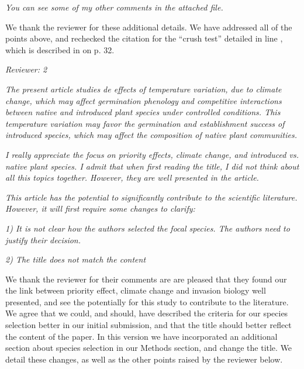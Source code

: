 \documentclass[11pt]{article}
\begin{document}



\emph{You can see some of my other comments in the attached file.}

We thank the reviewer for these additional details. We have addressed all of the points above, and rechecked the citation for the ``crush test'' detailed in line , which is described in \citet{Baskin2014} on p. 32. 

\emph{Reviewer: 2}

\emph{The present article studies de effects of temperature variation, due to climate change, which may affect germination phenology and competitive interactions between native and introduced plant species under controlled conditions. This temperature variation may favor the germination and establishment success of introduced species, which may affect the composition of native plant communities.}

\emph{I really appreciate the focus on priority effects, climate change, and introduced vs. native plant species. I admit that when first reading the title, I did not think about all this topics together. However, they are well presented in the article.}

\emph{This article has the potential to significantly contribute to the scientific literature. However, it will first require some changes to clarify:}

\emph{1) It is not clear how the authors selected the focal species. The authors need to justify their decision.}

\emph{2) The title does not match the content}

We thank the reviewer for their comments are are pleased that they found our the link between priority effect, climate change and invasion biology well presented, and see the potentially for this study to contribute to the literature. We agree that we could, and should, have described the criteria for our species selection better in our initial submission, and that the title should better reflect the content of the paper. In this version we have incorporated an additional section about species selection in our Methods section, and change the title. We detail these changes, as well as the other points raised by the reviewer below.
\end{document}
